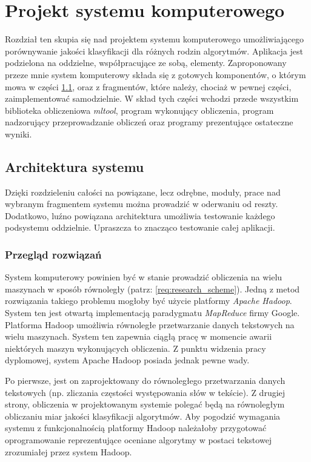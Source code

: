 \documentclass[../thesis.tex]{subfiles}
\begin{document}
\pagestyle{plain}

\chapter{Projekt systemu komputerowego}

Rozdział ten skupia się nad projektem systemu komputerowego umożliwiającego porównywanie jakości klasyfikacji dla różnych rodzin algorytmów. Aplikacja jest podzielona na oddzielne, współpracujące ze sobą, elementy. Zaproponowany przeze mnie system komputerowy składa się z gotowych komponentów, o którym mowa w części \ref{proj:arch}, oraz z fragmentów, które należy, chociaż w pewnej części, zaimplementować samodzielnie. W skład tych części wchodzi przede wszystkim biblioteka obliczeniowa \emph{mltool}, program wykonujący obliczenia, program nadzorujący przeprowadzanie obliczeń oraz programy prezentujące ostateczne wyniki.

\section{Architektura systemu}
\label{proj:arch}

Dzięki rozdzieleniu całości na powiązane, lecz odrębne, moduły, prace nad wybranym fragmentem systemu można prowadzić w oderwaniu od reszty. Dodatkowo, luźno powiązana architektura umożliwia testowanie każdego podsystemu oddzielnie. Upraszcza to znacząco testowanie całej aplikacji.

\subsection{Przegląd rozwiązań}

System komputerowy powinien być w stanie prowadzić obliczenia na wielu maszynach w sposób równoległy (patrz: \ref{req:research_scheme}). Jedną z metod rozwiązania takiego problemu mogłoby być użycie platformy \emph{Apache Hadoop}. System ten jest otwartą implementacją paradygmatu \emph{MapReduce} firmy Google. Platforma Hadoop umożliwia równoległe przetwarzanie danych tekstowych na wielu maszynach. System ten zapewnia ciągłą pracę w momencie awarii niektórych maszyn wykonujących obliczenia. Z punktu widzenia pracy dyplomowej, system Apache Hadoop posiada jednak pewne wady. 

Po pierwsze, jest on zaprojektowany do równoległego przetwarzania danych tekstowych (np. zliczania częstości występowania słów w tekście). Z drugiej strony, obliczenia w projektowanym systemie polegać będą na równoległym obliczaniu miar jakości klasyfikacji algorytmów. Aby pogodzić wymagania systemu z funkcjonalnością platformy Hadoop należałoby przygotować oprogramowanie reprezentujące oceniane algorytmy w postaci tekstowej zrozumiałej przez system Hadoop. 
\end{document}
